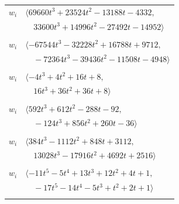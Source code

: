 \documentclass[11pt]{article}
\begin{document}
\begin{longtable}{@{}ll@{}}
$w_i$ & $\langle 69660t^{3}+23524t^{2}-13188t-4332,$\\
 & $\quad 33600t^{3}+14996t^{2}-27492t-14952\rangle$\\
\addlinespace[2pt]
\multicolumn{2}{@{}p{0.97\textwidth}@{}}{$i=5$, $D_i=1024$, $\rho_{ij}$: $0{:}1, \allowbreak 9{:}1, \allowbreak 11{:}2, \allowbreak 12{:}1, \allowbreak 14{:}1, \allowbreak 22{:}2, \allowbreak 34{:}2, \allowbreak 37{:}1, \allowbreak 38{:}2, \allowbreak 41{:}2, \allowbreak 45{:}2$}\\
$w_i$ & $\langle -67544t^{3}-32228t^{2}+16788t+9712,$\\
 & $\quad -72364t^{3}-39436t^{2}-11508t-4948\rangle$\\
\addlinespace[2pt]
\multicolumn{2}{@{}p{0.97\textwidth}@{}}{$i=6$, $D_i=4$, $\rho_{ij}$: $7{:}2, \allowbreak 15{:}1, \allowbreak 23{:}2, \allowbreak 28{:}2, \allowbreak 34{:}1, \allowbreak 52{:}1$}\\
$w_i$ & $\langle -4t^{3}+4t^{2}+16t+8,$\\
 & $\quad 16t^{3}+36t^{2}+36t+8\rangle$\\
\addlinespace[2pt]
\multicolumn{2}{@{}p{0.97\textwidth}@{}}{$i=7$, $D_i=32$, $\rho_{ij}$: $6{:}1, \allowbreak 14{:}2, \allowbreak 16{:}1, \allowbreak 22{:}2, \allowbreak 33{:}2, \allowbreak 34{:}2, \allowbreak 38{:}2$}\\
$w_i$ & $\langle 592t^{3}+612t^{2}-288t-92,$\\
 & $\quad -124t^{3}+856t^{2}+260t-36\rangle$\\
\addlinespace[2pt]
\multicolumn{2}{@{}p{0.97\textwidth}@{}}{$i=8$, $D_i=128$, $\rho_{ij}$: $12{:}2, \allowbreak 16{:}1, \allowbreak 17{:}2, \allowbreak 21{:}1, \allowbreak 22{:}1, \allowbreak 25{:}1, \allowbreak 27{:}1, \allowbreak 29{:}2, \allowbreak 46{:}1, \allowbreak 49{:}2$}\\
$w_i$ & $\langle 384t^{3}-1112t^{2}+848t+3112,$\\
 & $\quad 13028t^{3}-17916t^{2}+4692t+2516\rangle$\\
\addlinespace[2pt]
\multicolumn{2}{@{}p{0.97\textwidth}@{}}{$i=9$, $D_i=1$, $\rho_{ij}$: $5{:}2, \allowbreak 11{:}2, \allowbreak 12{:}1, \allowbreak 19{:}2, \allowbreak 30{:}2, \allowbreak 32{:}1, \allowbreak 34{:}2$}\\
$w_i$ & $\langle -11t^{5}-5t^{4}+13t^{3}+12t^{2}+4t+1,$\\
 & $\quad -17t^{5}-14t^{4}-5t^{3}+t^{2}+2t+1\rangle$\\
\addlinespace[2pt]
\multicolumn{2}{@{}p{0.97\textwidth}@{}}{$i=10$, $D_i=1$, $\rho_{ij}$: $3{:}1, \allowbreak 14{:}1, \allowbreak 29{:}1, \allowbreak 30{:}2, \allowbreak 31{:}1, \allowbreak 33{:}1, \allowbreak 34{:}1, \allowbreak 46{:}2, \allowbreak 54{:}2$}\\

\end{longtable}
\end{document}
